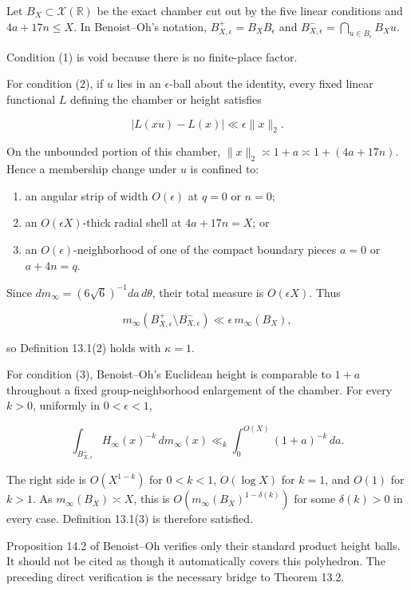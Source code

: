 Let \(B_X\subset\mathscr X(\mathbb R)\) be the exact chamber cut out by the five linear conditions and \(4a+17n\leq X\). In Benoist--Oh's notation, \(B_{X,\epsilon}^+=B_XB_\epsilon\) and \(B_{X,\epsilon}^-=\bigcap_{u\in B_\epsilon}B_Xu\).

Condition (1) is void because there is no finite-place factor.

For condition (2), if \(u\) lies in an \(\epsilon\)-ball about the identity, every fixed linear functional \(L\) defining the chamber or height satisfies

\[
 |L(xu)-L(x)|\ll\epsilon\|x\|_2.
\]

On the unbounded portion of this chamber, \(\|x\|_2\asymp 1+a\asymp1+(4a+17n)\). Hence a membership change under \(u\) is confined to:

\begin{enumerate}
\def\labelenumi{\arabic{enumi}.}

\item
  an angular strip of width \(O(\epsilon)\) at \(q=0\) or \(n=0\);
\item
  an \(O(\epsilon X)\)-thick radial shell at \(4a+17n=X\); or
\item
  an \(O(\epsilon)\)-neighborhood of one of the compact boundary pieces \(a=0\) or \(a+4n=q\).
\end{enumerate}

Since \(dm_\infty=(6\sqrt6)^{-1}da\,d\theta\), their total measure is \(O(\epsilon X)\). Thus

\[
 m_\infty(B_{X,\epsilon}^+\setminus B_{X,\epsilon}^-)
 \ll \epsilon\,m_\infty(B_X),
\]

so Definition 13.1(2) holds with \(\kappa=1\).

For condition (3), Benoist--Oh's Euclidean height is comparable to \(1+a\) throughout a fixed group-neighborhood enlargement of the chamber. For every \(k>0\), uniformly in \(0<\epsilon<1\),

\[
 \int_{B_{X,\epsilon}^+}H_\infty(x)^{-k}\,dm_\infty(x)
 \ll_k\int_0^{O(X)}(1+a)^{-k}\,da.
\]

The right side is \(O(X^{1-k})\) for \(0<k<1\), \(O(\log X)\) for \(k=1\), and \(O(1)\) for \(k>1\). As \(m_\infty(B_X)\asymp X\), this is \(O(m_\infty(B_X)^{1-\delta(k)})\) for some \(\delta(k)>0\) in every case. Definition 13.1(3) is therefore satisfied.

Proposition 14.2 of Benoist--Oh verifies only their standard product height balls. It should not be cited as though it automatically covers this polyhedron. The preceding direct verification is the necessary bridge to Theorem 13.2.

